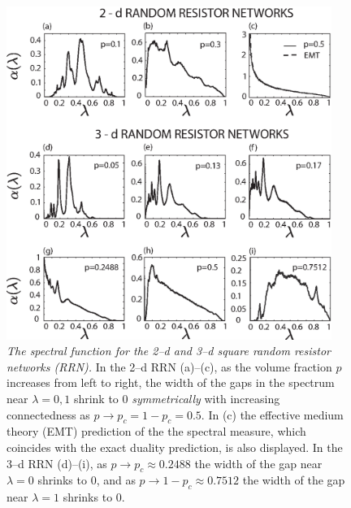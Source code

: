 \documentclass[english,12pt,jmp,graphicx]{revtex4-1}
\begin{document}
\begin{figure}
\includegraphics[width=25pc]{2-3-d_Random_Resistor_Networks.eps}
\caption{\emph{The spectral function for the 2--d and 3--d square
    random resistor networks (RRN).} In the 2--d RRN (a)--(c), as the
  volume fraction $p$ increases from left to right,
  the width of the gaps in the spectrum near $\lambda=0,1$ shrink to 0
  \emph{symmetrically} with increasing connectedness as
  $p\to p_c=1-p_c=0.5$. In (c) the effective medium theory (EMT)  
  prediction of the the spectral measure, which coincides with the
  exact duality prediction, is also displayed. In
  the 3--d RRN (d)--(i), as $p\to p_c\approx0.2488$ the width of the gap near
  $\lambda=0$ shrinks to 0, and as $p\to1-p_c\approx0.7512$ the width of the gap
  near $\lambda=1$ shrinks to 0.} 
\end{figure} \label{fig:2D-RBN}
%
%
\end{document}
